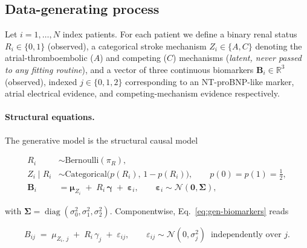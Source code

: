 %
%

\subsection{Data-generating process}
\label{sec:generator}

Let $i = 1,\dots,N$ index patients. For each patient we define a binary renal
status $R_i \in \{0,1\}$ (observed), a categorical stroke mechanism
$Z_i \in \{A, C\}$ denoting the atrial-thromboembolic ($A$) and competing ($C$)
mechanisms (\emph{latent, never passed to any fitting routine}), and a vector of
three continuous biomarkers $\bm{B}_i \in \mathbb{R}^{3}$ (observed), indexed
$j \in \{0,1,2\}$ corresponding to an NT-proBNP-like marker, atrial electrical
evidence, and competing-mechanism evidence respectively.

\paragraph{Structural equations.}
The generative model is the structural causal model

\begin{align}
  R_i        &\sim \mathrm{Bernoulli}(\pi_R), \label{eq:gen-renal}\\[2pt]
  Z_i \mid R_i &\sim \mathrm{Categorical}\!\big(p(R_i),\, 1 - p(R_i)\big),
                 \qquad p(0) = p(1) = \tfrac{1}{2}, \label{eq:gen-mech}\\[2pt]
  \bm{B}_i   &= \bm{\mu}_{Z_i} \;+\; R_i\,\bm{\gamma} \;+\; \bm{\varepsilon}_i,
                 \qquad
                 \bm{\varepsilon}_i \sim \mathcal{N}(\bm{0}, \bm{\Sigma}),
                 \label{eq:gen-biomarkers}
\end{align}

with $\bm{\Sigma} = \operatorname{diag}(\sigma_0^2, \sigma_1^2, \sigma_2^2)$.
Componentwise, Eq.~\eqref{eq:gen-biomarkers} reads

\begin{equation}
  B_{ij} \;=\; \mu_{Z_i,\,j} \;+\; R_i\,\gamma_j \;+\; \varepsilon_{ij},
  \qquad
  \varepsilon_{ij} \sim \mathcal{N}(0, \sigma_j^2)
  \;\;\text{independently over } j .
  \label{eq:gen-component}
\end{equation}

